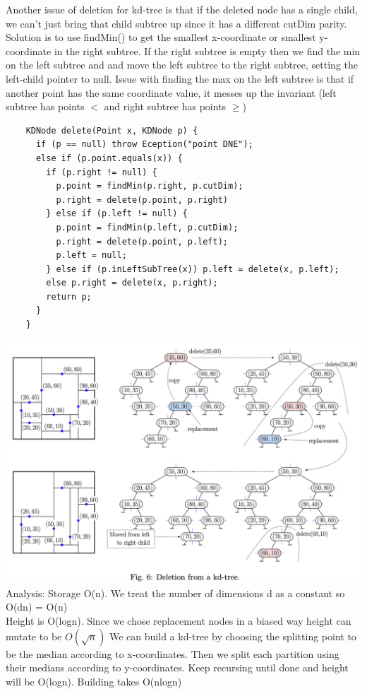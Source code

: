 \documentclass{article}
\begin{document}
  \newpage
  Another issue of deletion for kd-tree is that if the deleted node has a single child, we can't just bring that child subtree up since it has a different cutDim parity. Solution is to use findMin() to get the smallest x-coordinate or smallest y-coordinate in the right subtree. If the right subtree is empty then we find the min on the left subtree and and move the left subtree to the right subtree, setting the left-child pointer to null. Issue with finding the max on the left subtree is that if another point has the same coordinate value, it messes up the invariant (left subtree has points $<$ and right subtree has points $\geq$)
  \begin{lstlisting}
    KDNode delete(Point x, KDNode p) {
      if (p == null) throw Eception("point DNE");
      else if (p.point.equals(x)) {
        if (p.right != null) {
          p.point = findMin(p.right, p.cutDim);
          p.right = delete(p.point, p.right)
        } else if (p.left != null) {
          p.point = findMin(p.left, p.cutDim);
          p.right = delete(p.point, p.left);
          p.left = null;
        } else if (p.inLeftSubTree(x)) p.left = delete(x, p.left);
        else p.right = delete(x, p.right);
        return p;
      }
    }
  \end{lstlisting}
  \includegraphics[width=\textwidth]{KDTreeDeletion}
  \newpage
  \noindent Analysis: Storage O(n). We treat the number of dimensions d as a constant so O(dn) = O(n)\\
  Height is O(logn). Since we chose replacement nodes in a biased way height can mutate to be $O(\sqrt{n})$
  We can build a kd-tree by choosing the splitting point to be the median according to x-coordinates. Then we split each partition using their medians according to y-coordinates. Keep recursing until done and height will be O(logn). Building takes O(nlogn)\\ \\
\end{document}
